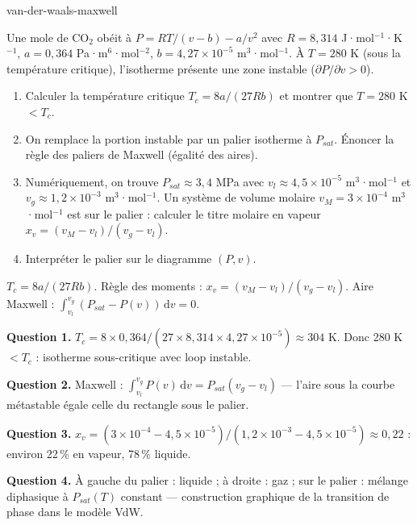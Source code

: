 \begin{exo}{van-der-waals-maxwell}

Une mole de CO$_2$ obéit à $P = RT/(v-b) - a/v^2$ avec $R = 8{,}314$ J·mol$^{-1}$·K$^{-1}$, $a = 0{,}364$ Pa·m$^6$·mol$^{-2}$, $b = 4{,}27\times10^{-5}$ m$^3$·mol$^{-1}$. À $T = 280$ K (sous la température critique), l'isotherme présente une zone instable ($\partial P/\partial v > 0$).

\begin{enumerate}
\item Calculer la température critique $T_c = 8a/(27Rb)$ et montrer que $T = 280$ K $< T_c$.
\item On remplace la portion instable par un palier isotherme à $P_{sat}$. Énoncer la règle des paliers de Maxwell (égalité des aires).
\item Numériquement, on trouve $P_{sat} \approx 3{,}4$ MPa avec $v_l \approx 4{,}5\times10^{-5}$ m$^3$·mol$^{-1}$ et $v_g \approx 1{,}2\times10^{-3}$ m$^3$·mol$^{-1}$. Un système de volume molaire $v_M = 3\times10^{-4}$ m$^3$·mol$^{-1}$ est sur le palier : calculer le titre molaire en vapeur $x_v = (v_M - v_l)/(v_g - v_l)$.
\item Interpréter le palier sur le diagramme $(P,v)$.
\end{enumerate}

\begin{indication}
$T_c = 8a/(27Rb)$. Règle des moments : $x_v = (v_M - v_l)/(v_g - v_l)$. Aire Maxwell : $\int_{v_l}^{v_g}(P_{sat} - P(v))\,\mathrm{d}v = 0$.
\end{indication}

\begin{solution}
\textbf{Question 1.} $T_c = 8\times0{,}364/(27\times8{,}314\times4{,}27\times10^{-5}) \approx 304$ K. Donc 280 K $< T_c$ : isotherme sous-critique avec loop instable.

\textbf{Question 2.} Maxwell : $\int_{v_l}^{v_g} P(v)\,\mathrm{d}v = P_{sat}(v_g - v_l)$ — l'aire sous la courbe métastable égale celle du rectangle sous le palier.

\textbf{Question 3.} $x_v = (3\times10^{-4} - 4{,}5\times10^{-5})/(1{,}2\times10^{-3} - 4{,}5\times10^{-5}) \approx 0{,}22$ : environ 22\,\% en vapeur, 78\,\% liquide.

\textbf{Question 4.} À gauche du palier : liquide ; à droite : gaz ; sur le palier : mélange diphasique à $P_{sat}(T)$ constant — construction graphique de la transition de phase dans le modèle VdW.
\end{solution}
\end{exo}

